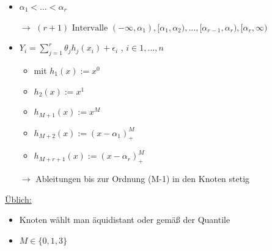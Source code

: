 \begin{itemize}
	\item $ \alpha_1 < \ldots < \alpha_r $
	\item[$\rightarrow$] $(r+1) \text{ Intervalle }  (-\infty, \alpha_1),[\alpha_1, \alpha_2) , \ldots, [\alpha_{r-1} , \alpha_r), [\alpha_r, \infty)$
	\item $Y_i  = \sum_{j=1}^{r} \theta_j h_j (x_i) + \epsilon_i$ , $i \in {1,\ldots,n}$
	\item [] 
	\begin{itemize}
		\item mit $h_1(x):=x^0$
		\item $h_2(x) := x^1$
		\item $h_{M+1}(x) := x^{M}$
		\item $h_{M+2}(x) := (x- \alpha_1)^{M}_{+}$
		\item $h_{M+r+1}(x) := (x- \alpha_r)^{M}_{+}$
	\end{itemize} 

\item[$\rightarrow$] Ableitungen bis zur Ordnung (M-1) in den Knoten stetig
\end{itemize}
\underline{Üblich:} 
\begin{itemize}
	\item Knoten wählt man äquidistant oder gemäß der Quantile
	\item $M \in \{0,1,3\}$
\end{itemize}

